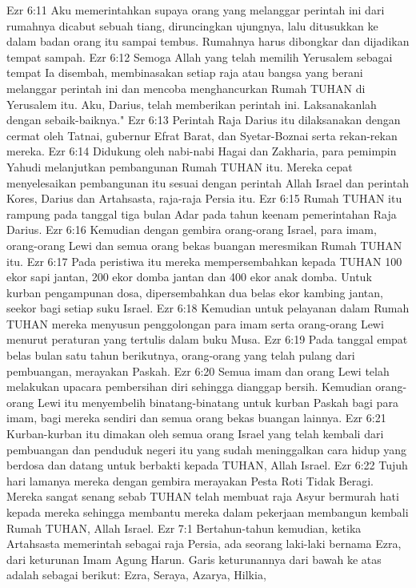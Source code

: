 Ezr 6:11  Aku memerintahkan supaya orang yang melanggar perintah ini dari rumahnya dicabut sebuah tiang, diruncingkan ujungnya, lalu ditusukkan ke dalam badan orang itu sampai tembus. Rumahnya harus dibongkar dan dijadikan tempat sampah.
Ezr 6:12  Semoga Allah yang telah memilih Yerusalem sebagai tempat Ia disembah, membinasakan setiap raja atau bangsa yang berani melanggar perintah ini dan mencoba menghancurkan Rumah TUHAN di Yerusalem itu. Aku, Darius, telah memberikan perintah ini. Laksanakanlah dengan sebaik-baiknya."
Ezr 6:13  Perintah Raja Darius itu dilaksanakan dengan cermat oleh Tatnai, gubernur Efrat Barat, dan Syetar-Boznai serta rekan-rekan mereka.
Ezr 6:14  Didukung oleh nabi-nabi Hagai dan Zakharia, para pemimpin Yahudi melanjutkan pembangunan Rumah TUHAN itu. Mereka cepat menyelesaikan pembangunan itu sesuai dengan perintah Allah Israel dan perintah Kores, Darius dan Artahsasta, raja-raja Persia itu.
Ezr 6:15  Rumah TUHAN itu rampung pada tanggal tiga bulan Adar pada tahun keenam pemerintahan Raja Darius.
Ezr 6:16  Kemudian dengan gembira orang-orang Israel, para imam, orang-orang Lewi dan semua orang bekas buangan meresmikan Rumah TUHAN itu.
Ezr 6:17  Pada peristiwa itu mereka mempersembahkan kepada TUHAN 100 ekor sapi jantan, 200 ekor domba jantan dan 400 ekor anak domba. Untuk kurban pengampunan dosa, dipersembahkan dua belas ekor kambing jantan, seekor bagi setiap suku Israel.
Ezr 6:18  Kemudian untuk pelayanan dalam Rumah TUHAN mereka menyusun penggolongan para imam serta orang-orang Lewi menurut peraturan yang tertulis dalam buku Musa.
Ezr 6:19  Pada tanggal empat belas bulan satu tahun berikutnya, orang-orang yang telah pulang dari pembuangan, merayakan Paskah.
Ezr 6:20  Semua imam dan orang Lewi telah melakukan upacara pembersihan diri sehingga dianggap bersih. Kemudian orang-orang Lewi itu menyembelih binatang-binatang untuk kurban Paskah bagi para imam, bagi mereka sendiri dan semua orang bekas buangan lainnya.
Ezr 6:21  Kurban-kurban itu dimakan oleh semua orang Israel yang telah kembali dari pembuangan dan penduduk negeri itu yang sudah meninggalkan cara hidup yang berdosa dan datang untuk berbakti kepada TUHAN, Allah Israel.
Ezr 6:22  Tujuh hari lamanya mereka dengan gembira merayakan Pesta Roti Tidak Beragi. Mereka sangat senang sebab TUHAN telah membuat raja Asyur bermurah hati kepada mereka sehingga membantu mereka dalam pekerjaan membangun kembali Rumah TUHAN, Allah Israel.
Ezr 7:1  Bertahun-tahun kemudian, ketika Artahsasta memerintah sebagai raja Persia, ada seorang laki-laki bernama Ezra, dari keturunan Imam Agung Harun. Garis keturunannya dari bawah ke atas adalah sebagai berikut: Ezra, Seraya, Azarya, Hilkia,
